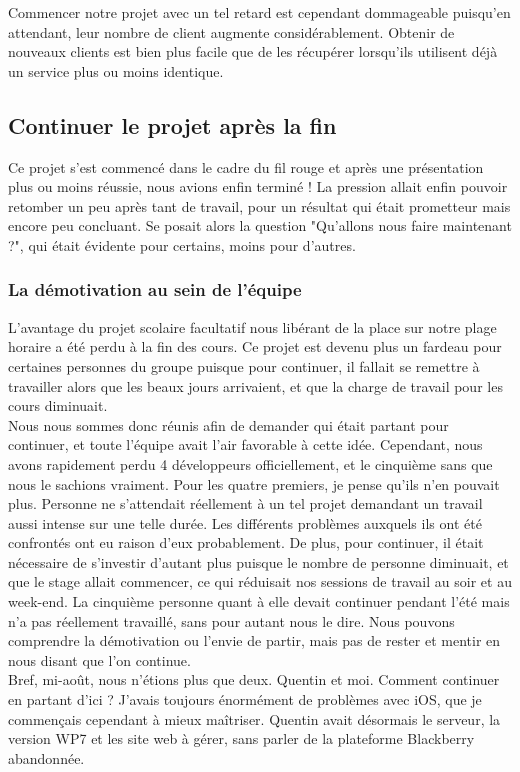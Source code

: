 \documentclass{article}
\begin{document}
		Commencer notre projet avec un tel retard est cependant dommageable puisqu'en attendant, leur nombre de client augmente considérablement. Obtenir de nouveaux clients est bien plus facile que de les récupérer lorsqu'ils utilisent déjà un service plus ou moins identique.
\subsection{Continuer le projet après la fin}
		Ce projet s'est commencé dans le cadre du fil rouge et après une présentation plus ou moins réussie, nous avions enfin terminé ! La pression allait enfin pouvoir retomber un peu après tant de travail, pour un résultat qui était prometteur mais encore peu concluant. Se posait alors la question "Qu'allons nous faire maintenant ?", qui était évidente pour certains, moins pour d'autres.
\subsubsection{La démotivation au sein de l'équipe}
		L'avantage du projet scolaire facultatif nous libérant de la place sur notre plage horaire a été perdu à la fin des cours. Ce projet est devenu plus un fardeau pour certaines personnes du groupe puisque pour continuer, il fallait se remettre à travailler alors que les beaux jours arrivaient, et que la charge de travail pour les cours diminuait. \\
		
		Nous nous sommes donc réunis afin de demander qui était partant pour continuer, et toute l'équipe avait l'air favorable à cette idée. Cependant, nous avons rapidement perdu 4 développeurs officiellement, et le cinquième sans que nous le sachions vraiment. Pour les quatre premiers, je pense qu'ils n'en pouvait plus. Personne ne s'attendait réellement à un tel projet demandant un travail aussi intense sur une telle durée. Les différents problèmes auxquels ils ont été confrontés ont eu raison d'eux probablement. De plus, pour continuer, il était nécessaire de s'investir d'autant plus puisque le nombre de personne diminuait, et que le stage allait commencer, ce qui réduisait nos sessions de travail au soir et au week-end. La cinquième personne quant à elle devait continuer pendant l'été mais n'a pas réellement travaillé, sans pour autant nous le dire. Nous pouvons comprendre la démotivation ou l'envie de partir, mais pas de rester et mentir en nous disant que l'on continue. \\
		
		Bref, mi-août, nous n'étions plus que deux. Quentin et moi. Comment continuer en partant d'ici ? J'avais toujours énormément de problèmes avec iOS, que je commençais cependant à mieux maîtriser. Quentin avait désormais le serveur, la version WP7 et les site web à gérer, sans parler de la plateforme Blackberry abandonnée.  
\end{document}
